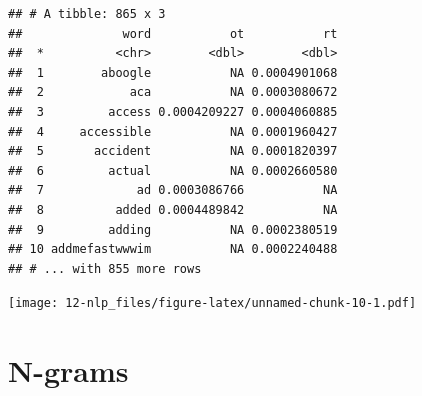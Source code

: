 \documentclass[]{book}
\newenvironment{Shaded}{\begin{snugshade}}{\end{snugshade}}
\newcommand{\KeywordTok}[1]{\textcolor[rgb]{0.13,0.29,0.53}{\textbf{{#1}}}}
\newcommand{\DataTypeTok}[1]{\textcolor[rgb]{0.13,0.29,0.53}{{#1}}}
\newcommand{\DecValTok}[1]{\textcolor[rgb]{0.00,0.00,0.81}{{#1}}}
\newcommand{\FloatTok}[1]{\textcolor[rgb]{0.00,0.00,0.81}{{#1}}}
\newcommand{\StringTok}[1]{\textcolor[rgb]{0.31,0.60,0.02}{{#1}}}
\newcommand{\OtherTok}[1]{\textcolor[rgb]{0.56,0.35,0.01}{{#1}}}
\newcommand{\NormalTok}[1]{{#1}}
\theoremstyle{definition}
\theoremstyle{definition}
\theoremstyle{remark}
\begin{document}
\begin{verbatim}
## # A tibble: 865 x 3
##              word           ot           rt
##  *          <chr>        <dbl>        <dbl>
##  1        aboogle           NA 0.0004901068
##  2            aca           NA 0.0003080672
##  3         access 0.0004209227 0.0004060885
##  4     accessible           NA 0.0001960427
##  5       accident           NA 0.0001820397
##  6         actual           NA 0.0002660580
##  7             ad 0.0003086766           NA
##  8          added 0.0004489842           NA
##  9         adding           NA 0.0002380519
## 10 addmefastwwwim           NA 0.0002240488
## # ... with 855 more rows
\end{verbatim}

\begin{Shaded}
\end{Shaded}

\texttt{[image: 12-nlp\_files/figure-latex/unnamed-chunk-10-1.pdf]}

\section{N-grams}\label{n-grams}
\end{document}
